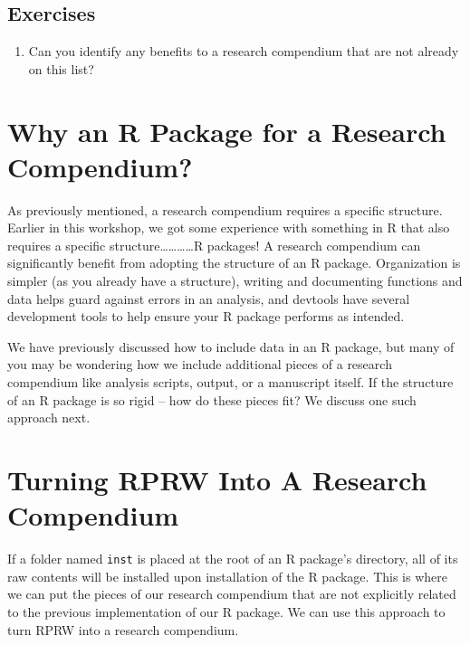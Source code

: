 \documentclass[
]{book}
\providecommand{\tightlist}{%
  \setlength{\itemsep}{0pt}\setlength{\parskip}{0pt}}
\begin{document}
\hypertarget{exercises-6}{%
\subsection{Exercises}\label{exercises-6}}

\begin{enumerate}
\def\labelenumi{\arabic{enumi}.}
\tightlist
\item
  Can you identify any benefits to a research compendium that are not already on this list?
\end{enumerate}

\hypertarget{why-an-r-package-for-a-research-compendium}{%
\section{Why an R Package for a Research Compendium?}\label{why-an-r-package-for-a-research-compendium}}

As previously mentioned, a research compendium requires a specific structure. Earlier in this workshop, we got some experience with something in R that also requires a specific structure\ldots\ldots\ldots\ldots R packages! A research compendium can significantly benefit from adopting the structure of an R package. Organization is simpler (as you already have a structure), writing and documenting functions and data helps guard against errors in an analysis, and devtools have several development tools to help ensure your R package performs as intended.

We have previously discussed how to include data in an R package, but many of you may be wondering how we include additional pieces of a research compendium like analysis scripts, output, or a manuscript itself. If the structure of an R package is so rigid -- how do these pieces fit? We discuss one such approach next.

\hypertarget{turning-rprw-into-a-research-compendium}{%
\section{Turning RPRW Into A Research Compendium}\label{turning-rprw-into-a-research-compendium}}

If a folder named \texttt{inst} is placed at the root of an R package's directory, all of its raw contents will be installed upon installation of the R package. This is where we can put the pieces of our research compendium that are not explicitly related to the previous implementation of our R package. We can use this approach to turn RPRW into a research compendium.
\end{document}
